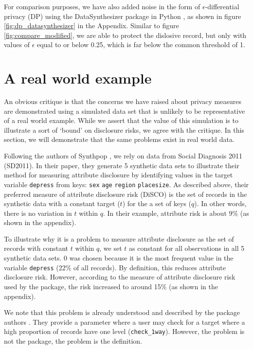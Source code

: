 \documentclass[runningheads]{llncs}
\begin{document}
For comparison purposes, we have also added noise in the form of $\epsilon$-differential privacy (DP) using the DataSynthesizer package in Python \cite{ping2017datasynthesizer}, as shown in figure \ref{fig:dp_datasynthesizer} in the Appendix.  Similar to figure \ref{fig:compare_modified}, we are able to protect the dislosive record, but only with values of $\epsilon$ equal to or below 0.25, which is far below the common threshold of 1. 

\section{A real world example}

An obvious critique is that the concerns we have raised about privacy measures are demonstrated using a simulated data set that is unlikely to be representative of a real world example.  While we assert that the value of this simulation is to illustrate a sort of `bound' on disclosure risks, we agree with the critique.  In this section, we will demonstrate that the same problems exist in real world data.

Following the authors of Synthpop \cite{raab2024practical}, we rely on data from Social Diagnosis 2011 (SD2011).  In their paper, they generate 5 synthetic data sets to illustrate their method for measuring attribute disclosure by identifying values in the target variable \texttt{depress} from keys: \texttt{sex} \texttt{age} \texttt{region} \texttt{placesize}.  As described above, their preferred measure of attribute disclosure risk (DiSCO) is the set of records in the synthetic data with a constant target ($t$) for the a set of keys ($q$).  In other words, there is no variation in $t$ within $q$.  In their example, attribute risk is about 9\% (as shown in the appendix).  

To illustrate why it is a problem to measure attribute disclosure as the set of records with constant $t$ within $q$, we set $t$ as constant for all observations in all 5 synthetic data sets.  0 was chosen because it is the most frequent value in the variable \texttt{depress} (22\% of all records).  By definition, this reduces attribute disclosure risk.  However, according to the measure of attribute disclosure risk used by the package, the risk increased to around 15\% (as shown in the appendix).

We note that this problem is already understood and described by the package authors \cite{raab2024practical}.  They provide a parameter where a user may check for a target where a high proportion of records have one level (\texttt{check\_1way}).  However, the problem is not the package, the problem is the definition.
\end{document}
